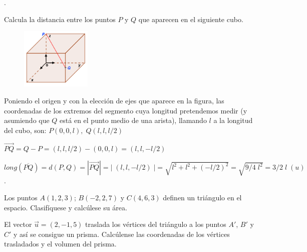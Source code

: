 	\begin{multicols}{2}
\begin{ejre}.
	
	Calcula la distancia entre los puntos $P$ y $Q$ que aparecen en el siguiente cubo.
	
	\begin{figure}[H]
	\centering
	\includegraphics[width=0.3\textwidth]{imagenes/imagenes09/T09IM26.png}
	\end{figure}
	
\end{ejre}
	\end{multicols}
	
\begin{proofw}\renewcommand{\qedsymbol}{$\diamond$}
	Poniendo el origen y con la elección de ejes que aparece en la figura, las coordenadas de los extremos del segmento cuya longitud pretendemos medir (y asumiendo que $Q$ está en el punto medio de una arista), llamando $l$ a la longitud del cubo, son: $P(0,0,l),\; Q(l,l,l/2)$
	
\noindent $\overrightarrow{PQ}=Q-P=(l,l,l/2)-(0,0,l)=(l,l,-l/2)$

\noindent $long(\overline{PQ} )=d(P,Q)=|\overrightarrow{PQ}|=|\; (l,l,-l/2) \;|=\sqrt{l^2+l^2+(-l/2)^2}=\sqrt{9/4 \; l^2}=3/2 \; l\; (u)$.
\end{proofw}

\begin{ejre}
	Los puntos $A(1,2,3)$; $B(-2,2,7)$ y $C(4,6,3)$ definen un triángulo en el espacio. Clasifíquese y calcúlese su área.
	
	El vector $\vec u=(2,-1,5)$ traslada los vértices del triángulo a los puntos $A'$, $B'$ y $C'$ y así se consigue un prisma. Calcúlense las coordenadas de los vértices trasladados y el volumen del prisma.
\end{ejre}


